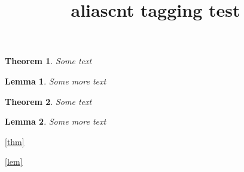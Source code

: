 \documentclass{article}
\title{aliascnt tagging test}
\newtheorem{theorem}{Theorem}
\newtheorem{lemma}[lemma]{Lemma}
\begin{document}
\begin{theorem}\label{thm}
Some text
\end{theorem}

\begin{lemma}\label{lem}
Some more text
\end{lemma}

\begin{theorem}
Some text
\end{theorem}

\begin{lemma}
Some more text
\end{lemma}

\autoref{thm}

\autoref{lem}
\end{document}
